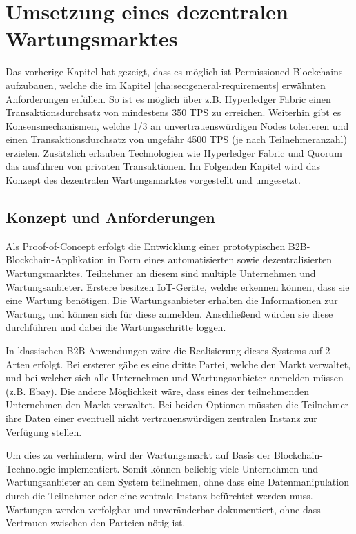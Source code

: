 \chapter{Umsetzung eines dezentralen Wartungsmarktes}
\label{cha:wartungsmarkt-impl}

Das vorherige Kapitel hat gezeigt, dass es möglich ist Permissioned Blockchains aufzubauen, welche die im Kapitel \ref{cha:sec:general-requirements} erwähnten Anforderungen erfüllen. So ist es möglich über z.B. Hyperledger Fabric einen Transaktionsdurchsatz von mindestens 350 TPS zu erreichen. Weiterhin gibt es Konsensmechanismen, welche 1/3 an unvertrauenswürdigen Nodes tolerieren und einen Transaktionsdurchsatz von ungefähr 4500 TPS (je nach Teilnehmeranzahl) erzielen. Zusätzlich erlauben Technologien wie Hyperledger Fabric und Quorum das ausführen von privaten Transaktionen. Im Folgenden Kapitel wird das Konzept des dezentralen Wartungsmarktes vorgestellt und umgesetzt.

\section{Konzept und Anforderungen}
Als Proof-of-Concept erfolgt die Entwicklung einer prototypischen B2B-Blockchain-Applikation in Form eines automatisierten sowie dezentralisierten Wartungsmarktes. Teilnehmer an diesem sind multiple Unternehmen und Wartungsanbieter. Erstere besitzen IoT-Geräte, welche erkennen können, dass sie eine Wartung benötigen. Die Wartungsanbieter erhalten die Informationen zur Wartung, und können sich für diese anmelden. Anschließend würden sie diese durchführen und dabei die Wartungsschritte loggen.  

In klassischen B2B-Anwendungen wäre die Realisierung dieses Systems auf 2 Arten erfolgt. Bei ersterer gäbe es eine dritte Partei, welche den Markt verwaltet, und bei welcher sich alle Unternehmen und Wartungsanbieter anmelden müssen (z.B. Ebay). Die andere Möglichkeit wäre, dass eines der teilnehmenden Unternehmen den Markt verwaltet. Bei beiden Optionen müssten die Teilnehmer ihre Daten einer eventuell nicht vertrauenswürdigen zentralen Instanz zur Verfügung stellen.

Um dies zu verhindern, wird der Wartungsmarkt auf Basis der Blockchain-Technologie implementiert. Somit können beliebig viele Unternehmen und Wartungsanbieter an dem System teilnehmen, ohne dass eine Datenmanipulation durch die Teilnehmer oder eine zentrale Instanz befürchtet werden muss. Wartungen werden verfolgbar und unveränderbar dokumentiert, ohne dass Vertrauen zwischen den Parteien nötig ist.

